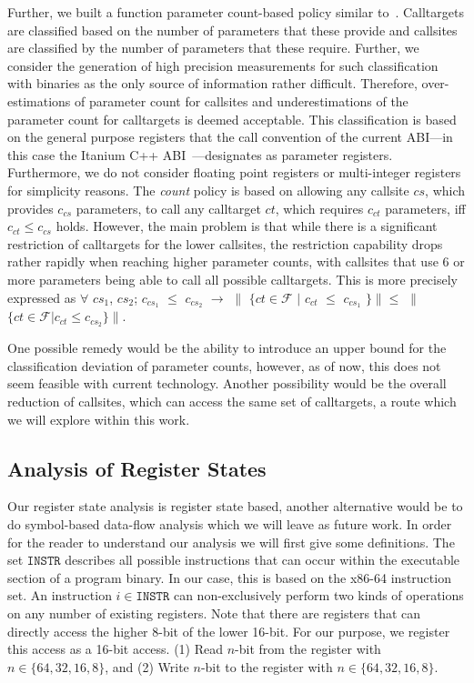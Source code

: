 Further, we built a function parameter count-based policy similar to~\cite{veen:typearmor}. Calltargets are classified based on the number of parameters 
that these provide and callsites are classified by the number of parameters that these require. 
Further, we consider the generation of high precision measurements for such classification with binaries as the only source of information rather difficult. 
Therefore, over-estimations of parameter count for callsites and underestimations of the parameter count for calltargets is deemed acceptable. 
This classification is based on the general purpose registers that the call convention of the current ABI---in this case the 
Itanium C++ ABI~\cite{itanium:abi}---designates as parameter registers. Furthermore, we do not consider floating point registers or multi-integer registers for simplicity
reasons.
The \emph{count} policy is based on allowing any callsite $cs$, which provides $c_{cs}$ parameters, to call any calltarget $ct$, 
which requires $c_{ct}$ parameters, iff $c_{ct} \leq c_{cs}$ holds. However, the main problem is that while there is a significant 
restriction of calltargets for the lower callsites, the restriction capability drops rather rapidly when reaching higher parameter 
counts, with callsites that use 6 or more parameters being able to call all possible calltargets.
This is more precisely expressed as 
$\forall$ $cs_1$, $cs_2$; $c_{cs_1}$ $\leq$ $c_{cs_2}$ $\rightarrow$  $\|$ $\{ct \in \mathcal{F}$ $|$ $c_{ct}$ $\leq$ $c_{cs_1}$ $\} \| \leq$ $\|$ $\{ct \in \mathcal{F} | c_{ct} \leq c_{cs_2}  \} \|$.

One possible remedy would be the ability to introduce an upper bound for the classification deviation of parameter counts, 
however, as of now, this does not seem feasible with current technology. Another possibility would be the overall reduction
of callsites, which can access the same set of calltargets, a route which we will explore within this work.

\subsection{Analysis of Register States}
\label{section:instructionanalysis}

Our register state analysis is register state based, another alternative would be to do symbol-based data-flow analysis which we will leave as future work.
In order for the reader to understand our analysis we will first give some definitions.
The set $\texttt{INSTR}$ describes all possible instructions that can occur within the executable section of a program binary. In our case,
this is based on the x86-64 instruction set. An instruction $i \in \texttt{INSTR}$ can non-exclusively perform two kinds of operations on any number of existing 
registers. Note that there are registers that can directly access the higher 
8-bit of the lower 16-bit. For our purpose, we register this access as a 16-bit access.
(1) Read $n$-bit from the register with $n \in \{ 64, 32, 16, 8 \}$, and 
(2) Write $n$-bit to the register with $n \in \{ 64, 32, 16, 8 \}$.

